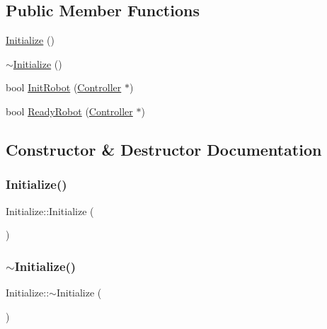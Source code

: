 \subsection*{Public Member Functions}
\begin{DoxyCompactItemize}
\item 
\mbox{\hyperlink{class_initialize_abf1b9cd9a5afcc55511b353125d5db9b}{Initialize}} ()
\item 
\mbox{\hyperlink{class_initialize_ae2e83afedeb2d83d133a9b10723e4cf1}{$\sim$\+Initialize}} ()
\item 
bool \mbox{\hyperlink{class_initialize_afaeae9e331da4559ae27c7c1f22d92df}{Init\+Robot}} (\mbox{\hyperlink{class_controller}{Controller}} $\ast$)
\item 
bool \mbox{\hyperlink{class_initialize_ab6682470e76cf6ff4b3e75707096dac9}{Ready\+Robot}} (\mbox{\hyperlink{class_controller}{Controller}} $\ast$)
\end{DoxyCompactItemize}


\subsection{Constructor \& Destructor Documentation}
\mbox{\label{class_initialize_abf1b9cd9a5afcc55511b353125d5db9b}} 
\subsubsection{\texorpdfstring{Initialize()}{Initialize()}}
{\footnotesize\ttfamily Initialize\+::\+Initialize (\begin{DoxyParamCaption}{ }\end{DoxyParamCaption})}

\mbox{\label{class_initialize_ae2e83afedeb2d83d133a9b10723e4cf1}} 
\subsubsection{\texorpdfstring{$\sim$Initialize()}{~Initialize()}}
{\footnotesize\ttfamily Initialize\+::$\sim$\+Initialize (\begin{DoxyParamCaption}{ }\end{DoxyParamCaption})}




